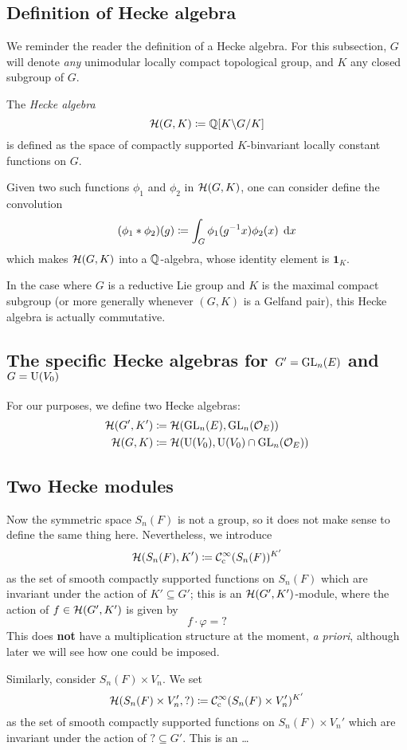 \subsection{Definition of Hecke algebra}
We reminder the reader the definition of a Hecke algebra.
For this subsection, $G$ will denote \emph{any}
unimodular locally compact topological group,
and $K$ any closed subgroup of $G$.

\begin{definition}
  The \emph{Hecke algebra}
  \[ \mathcal H(G, K) \coloneqq \mathbb Q[K \backslash G \slash K] \]
  is defined as the space of compactly supported $K$-binvariant
  locally constant functions on $G$.

  Given two such functions $\phi_1$ and $\phi_2$ in $\mathcal H(G,K)$,
  one can consider define the convolution
  \[ (\phi_1 \ast \phi_2)(g) \coloneqq \int_G \phi_1(g\inv x) \phi_2(x) \; \odif x \]
  which makes $\mathcal H(G, K)$ into a $\mathbb Q$-algebra,
  whose identity element is $\mathbf{1}_K$.
\end{definition}
In the case where $G$ is a reductive Lie group and
$K$ is the maximal compact subgroup
(or more generally whenever $(G,K)$ is a Gelfand pair),
this Hecke algebra is actually commutative.

\subsection{The specific Hecke algebras for $G' = \operatorname{GL}_n(E)$ and $G = \operatorname{U}(V_0)$}
For our purposes, we define two Hecke algebras:
\begin{align*}
  \mathcal H(G', K') &\coloneqq \mathcal H(\operatorname{GL}_n(E), \operatorname{GL}_n(\mathcal O_E)) \\
  \mathcal H(G, K) &\coloneqq \mathcal H(\operatorname{U}(V_0), \operatorname{U}(V_0) \cap \operatorname{GL}_n(\mathcal O_E))
\end{align*}

\subsection{Two Hecke modules}
Now the symmetric space $S_n(F)$ is not a group,
so it does not make sense to define the same thing here.
Nevertheless, we introduce
\[ \mathcal H(S_n(F), K') \coloneqq \mathcal C_{\mathrm{c}}^{\infty}(S_n(F))^{K'} \]
as the set of smooth compactly supported functions on $S_n(F)$
which are invariant under the action of $K' \subseteq G'$;
this is an $\mathcal H(G', K')$-module, where the action of $f \in \mathcal H(G', K')$ is given by
\[ f \cdot \varphi = {?} \]
This does \textbf{not} have a multiplication structure at the moment, \emph{a priori},
although later we will see how one could be imposed.

Similarly, consider $S_n(F) \times V_n$.
We set
\[ \mathcal H(S_n(F) \times V_n', {?}) \coloneqq \mathcal C_{\mathrm{c}}^{\infty}(S_n(F) \times V_n')^{K'} \]
as the set of smooth compactly supported functions on $S_n(F) \times V_n'$
which are invariant under the action of ${?} \subseteq G'$.
This is an \dots
